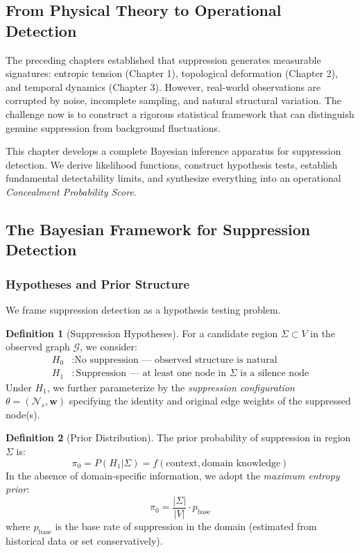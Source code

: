 \documentclass[12pt,a4paper]{article}
\theoremstyle{definition}
\newtheorem{definition}{Definition}[section]
\theoremstyle{remark}
\newcommand{\NS}{\mathcal{N}_s}          %
\newcommand{\Graph}{\mathcal{G}}         %
\begin{document}
\subsection{From Physical Theory to Operational Detection}

The preceding chapters established that suppression generates measurable signatures: entropic tension (Chapter 1), topological deformation (Chapter 2), and temporal dynamics (Chapter 3). However, real-world observations are corrupted by noise, incomplete sampling, and natural structural variation. The challenge now is to construct a rigorous statistical framework that can distinguish genuine suppression from background fluctuations.

This chapter develops a complete Bayesian inference apparatus for suppression detection. We derive likelihood functions, construct hypothesis tests, establish fundamental detectability limits, and synthesize everything into an operational \emph{Concealment Probability Score}.

\subsection{The Bayesian Framework for Suppression Detection}

\subsubsection{Hypotheses and Prior Structure}

We frame suppression detection as a hypothesis testing problem.

\begin{definition}[Suppression Hypotheses]
For a candidate region $\Sigma \subset V$ in the observed graph $\Graph$, we consider:
\begin{align}
    H_0 &: \text{No suppression — observed structure is natural} \\
    H_1 &: \text{Suppression — at least one node in } \Sigma \text{ is a silence node}
\end{align}
Under $H_1$, we further parameterize by the \emph{suppression configuration} $\theta = (\NS, \mathbf{w})$ specifying the identity and original edge weights of the suppressed node(s).
\end{definition}

\begin{definition}[Prior Distribution]
The prior probability of suppression in region $\Sigma$ is:
\begin{equation}
    \pi_0 = P(H_1 | \Sigma) = f(\text{context}, \text{domain knowledge})
\end{equation}
In the absence of domain-specific information, we adopt the \emph{maximum entropy prior}:
\begin{equation}
    \pi_0 = \frac{|\Sigma|}{|V|} \cdot p_{\text{base}}
\end{equation}
where $p_{\text{base}}$ is the base rate of suppression in the domain (estimated from historical data or set conservatively).
\end{definition}
\end{document}
